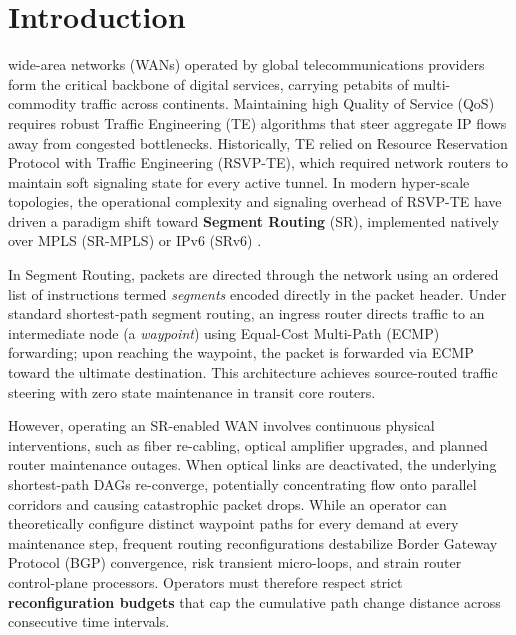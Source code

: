 \documentclass[10pt,journal,compsoc]{IEEEtran}
\begin{document}
\maketitle
\IEEEdisplaynontitleabstractindextext
\IEEEpeerreviewmaketitle

\section{Introduction}
 wide-area networks (WANs) operated by global telecommunications providers form the critical backbone of digital services, carrying petabits of multi-commodity traffic across continents. Maintaining high Quality of Service (QoS) requires robust Traffic Engineering (TE) algorithms that steer aggregate IP flows away from congested bottlenecks. Historically, TE relied on Resource Reservation Protocol with Traffic Engineering (RSVP-TE), which required network routers to maintain soft signaling state for every active tunnel. In modern hyper-scale topologies, the operational complexity and signaling overhead of RSVP-TE have driven a paradigm shift toward \textbf{Segment Routing} (SR), implemented natively over MPLS (SR-MPLS) or IPv6 (SRv6) \cite{filsfils2015,chopin2024}.

In Segment Routing, packets are directed through the network using an ordered list of instructions termed \textit{segments} encoded directly in the packet header. Under standard shortest-path segment routing, an ingress router directs traffic to an intermediate node (a \textit{waypoint}) using Equal-Cost Multi-Path (ECMP) forwarding; upon reaching the waypoint, the packet is forwarded via ECMP toward the ultimate destination. This architecture achieves source-routed traffic steering with zero state maintenance in transit core routers.

However, operating an SR-enabled WAN involves continuous physical interventions, such as fiber re-cabling, optical amplifier upgrades, and planned router maintenance outages. When optical links are deactivated, the underlying shortest-path DAGs re-converge, potentially concentrating flow onto parallel corridors and causing catastrophic packet drops. While an operator can theoretically configure distinct waypoint paths for every demand at every maintenance step, frequent routing reconfigurations destabilize Border Gateway Protocol (BGP) convergence, risk transient micro-loops, and strain router control-plane processors. Operators must therefore respect strict \textbf{reconfiguration budgets} that cap the cumulative path change distance across consecutive time intervals.
\end{document}
